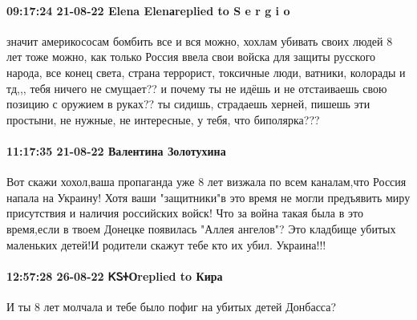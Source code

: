 \paragraph{09:17:24 21-08-22 Elena Elenаreplied to S e r g i o}

значит америкососам бомбить все и вся можно, хохлам убивать своих людей 8 лет
тоже можно, как только Россия ввела свои войска для защиты русского народа, все
конец света, страна террорист, токсичные люди, ватники, колорады и тд,,, тебя
ничего не смущает?? и почему ты не идёшь и не отстаиваешь свою позицию с
оружием в руках?? ты сидишь, страдаешь херней, пишешь эти простыни, не нужные,
не интересные, у тебя, что биполярка???

\paragraph{11:17:35 21-08-22 Валентина Золотухина}

Вот скажи хохол,ваша пропаганда уже 8 лет визжала по всем каналам,что Россия
напала на Украину! Хотя ваши "защитники"в это время не могли предъявить миру
присутствия и наличия российских войск! Что за война такая была в это
время,если в твоем Донецке появилась "Аллея ангелов"? Это кладбище убитых
маленьких детей!И родители скажут тебе кто их убил. Украина!!!

\paragraph{12:57:28 26-08-22 ᏦᏚᏐОreplied to Кира}

И ты 8 лет молчала и тебе было пофиг на убитых детей Донбасса?
